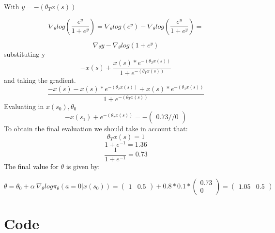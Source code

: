 \documentclass[10pt,a4paper]{article}
\begin{document}
With $y = -(\theta_T x(s)) $

\begin{equation*}
    \nabla_\theta log ( \frac{e^y}{1 + e^y} ) =  \nabla_\theta log(e^y) - \nabla_\theta log ( \frac{e^y}{1 + e^y} ) = 
\end{equation*}

\begin{equation*}
    \nabla_\theta y - \nabla_\theta log(1 + e^y )
\end{equation*}
substituting y
\begin{equation*}
    -x(s) + \frac{x(s) * e^{-(\theta_T x(s))}}{1+e^{-(\theta_T x(s))}}
\end{equation*}
and taking the gradient.
\begin{equation*}
    \frac{-x(s) - x(s) * e^{-(\theta_T x(s))} + x(s) * e^{-(\theta_T x(s))} }{1+ e^{-(\theta_T x(s))}}
\end{equation*}
Evaluating in $x(s_0), \theta_0$
\begin{equation*}
    -x(s_1) + e^{-(\theta_T x(s))} = -\begin{pmatrix} 0.73 // 0 \end{pmatrix}
\end{equation*}
To obtain the final evaluation we should take in account that:
\begin{equation*}
    \theta_T x(s) = 1
\end{equation*}
\begin{equation*}
    1 + e^{-1} = 1.36
\end{equation*}
\begin{equation*}
    \frac{1}{1+e^{-1}} = 0.73
\end{equation*}
The final value for $\theta$ is given by:

\begin{equation*}
    \theta = \theta_0 + \alpha \ \nabla_\theta log \pi_\theta (a = 0|x(s_0)) = \begin{pmatrix} 1 & 0.5 \end{pmatrix} +0.8 * 0.1 *\begin{pmatrix} 0.73 \\ 0 \end{pmatrix} = \begin{pmatrix} 1.05 & 0.5 \end{pmatrix}
\end{equation*}






\newpage
\section*{Code}
\end{document}

